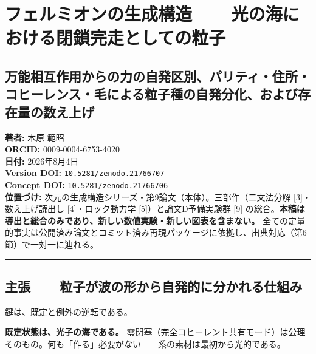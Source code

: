 \documentclass[
  a4paper,
]{ltjsarticle}
\author{}
\date{}
\begin{document}
\section{フェルミオンの生成構造------光の海における閉鎖完走としての粒子}\label{ux30d5ux30a7ux30ebux30dfux30aaux30f3ux306eux751fux6210ux69cbux9020ux5149ux306eux6d77ux306bux304aux3051ux308bux9589ux9396ux5b8cux8d70ux3068ux3057ux3066ux306eux7c92ux5b50}

\subsection{万能相互作用からの力の自発区別、パリティ・住所・コヒーレンス・毛による粒子種の自発分化、および存在量の数え上げ}\label{ux4e07ux80fdux76f8ux4e92ux4f5cux7528ux304bux3089ux306eux529bux306eux81eaux767aux533aux5225ux30d1ux30eaux30c6ux30a3ux4f4fux6240ux30b3ux30d2ux30fcux30ecux30f3ux30b9ux6bdbux306bux3088ux308bux7c92ux5b50ux7a2eux306eux81eaux767aux5206ux5316ux304aux3088ux3073ux5b58ux5728ux91cfux306eux6570ux3048ux4e0aux3052}

\textbf{著者:} 木原 範昭\\
\textbf{ORCID:} 0009-0004-6753-4020\\
\textbf{日付:} 2026年8月4日\\
\textbf{Version DOI:} \texttt{10.5281/zenodo.21766707}\\
\textbf{Concept DOI:} \texttt{10.5281/zenodo.21766706}\\
\textbf{位置づけ:}
次元の生成構造シリーズ・第9論文（本体）。三部作（二文法分解
{[}3{]}・数え上げ読出し {[}4{]}・ロック動力学 {[}5{]}）と論文D予備実験群
{[}9{]}
の総合。\textbf{本稿は導出と総合のみであり、新しい数値実験・新しい図表を含まない。}
全ての定量的事実は公開済み論文とコミット済み再現パッケージに依拠し、出典対応（第6節）で一対一に辿れる。

\begin{center}\rule{0.5\linewidth}{0.5pt}\end{center}

\subsection{主張------粒子が波の形から自発的に分かれる仕組み}\label{ux4e3bux5f35ux7c92ux5b50ux304cux6ce2ux306eux5f62ux304bux3089ux81eaux767aux7684ux306bux5206ux304bux308cux308bux4ed5ux7d44ux307f}

鍵は、既定と例外の逆転である。

\textbf{既定状態は、光子の海である。}
零閉塞（完全コヒーレント共有モード）は公理そのもの。何も「作る」必要がない------系の素材は最初から光的である。
\end{document}
